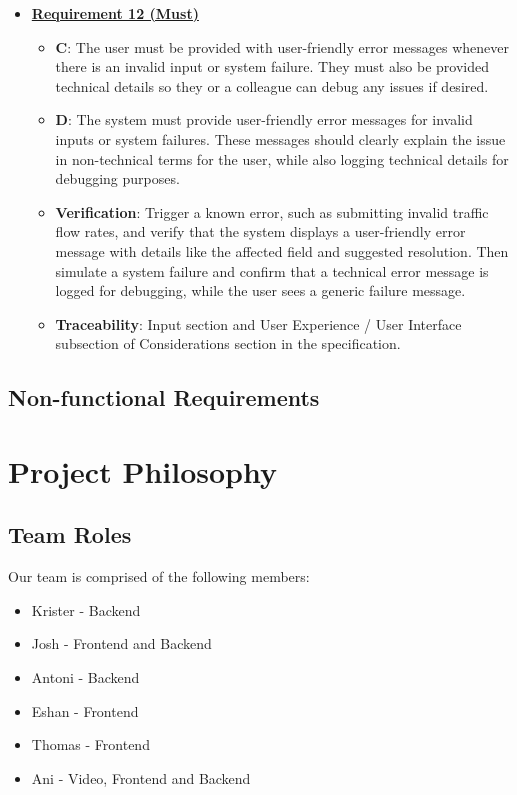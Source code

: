 \documentclass{article}
\begin{document}
\begin{itemize}
    \item \textbf{\underline{Requirement 12 (Must)}}
    \begin{itemize}
        \item \textbf{C}: The user must be provided with user-friendly error messages whenever there is an invalid 
        input or system failure. They must also be provided technical details so they or a colleague can debug any 
        issues if desired.
        \item \textbf{D}: The system must provide user-friendly error messages for invalid inputs or system failures. 
        These messages should clearly explain the issue in non-technical terms for the user, while also logging 
        technical details for debugging purposes.
        \item \textbf{Verification}: Trigger a known error, such as submitting invalid traffic flow rates, and verify 
        that the system displays a user-friendly error message with details like the affected field and suggested 
        resolution. Then simulate a system failure and confirm that a technical error message is logged for debugging, 
        while the user sees a generic failure message.
        \item\textbf{Traceability}: Input section and User Experience / User Interface subsection of Considerations 
        section in the specification.
    \end{itemize}
\end{itemize}

\subsection{Non-functional Requirements}

\section{Project Philosophy}
\subsection{Team Roles}
Our team is comprised of the following members:

\begin{itemize}
  \item Krister - Backend 
  \item Josh - Frontend and Backend 
  \item Antoni - Backend 
  \item Eshan - Frontend
  \item Thomas - Frontend
  \item Ani - Video, Frontend and Backend
\end{itemize}
\end{document}
